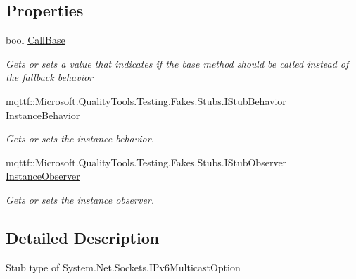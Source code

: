 \subsection*{Properties}
\begin{DoxyCompactItemize}
\item 
bool \hyperlink{class_system_1_1_net_1_1_sockets_1_1_fakes_1_1_stub_i_pv6_multicast_option_aa55aee0cd6eb7edafc01fefbf5d7a20d}{Call\-Base}
\begin{DoxyCompactList}\small\item\em Gets or sets a value that indicates if the base method should be called instead of the fallback behavior\end{DoxyCompactList}\item 
mqttf\-::\-Microsoft.\-Quality\-Tools.\-Testing.\-Fakes.\-Stubs.\-I\-Stub\-Behavior \hyperlink{class_system_1_1_net_1_1_sockets_1_1_fakes_1_1_stub_i_pv6_multicast_option_ae32bb636f032bbd4ab8a4889117d911e}{Instance\-Behavior}
\begin{DoxyCompactList}\small\item\em Gets or sets the instance behavior.\end{DoxyCompactList}\item 
mqttf\-::\-Microsoft.\-Quality\-Tools.\-Testing.\-Fakes.\-Stubs.\-I\-Stub\-Observer \hyperlink{class_system_1_1_net_1_1_sockets_1_1_fakes_1_1_stub_i_pv6_multicast_option_af2209116d3ed34ad06cb259376fa8ba2}{Instance\-Observer}
\begin{DoxyCompactList}\small\item\em Gets or sets the instance observer.\end{DoxyCompactList}\end{DoxyCompactItemize}


\subsection{Detailed Description}
Stub type of System.\-Net.\-Sockets.\-I\-Pv6\-Multicast\-Option




